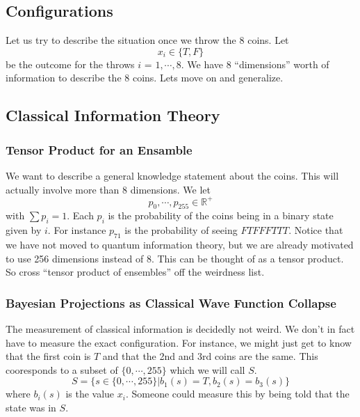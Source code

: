 \documentclass[12pt,a4paper]{article}
\begin{document}
\subsection{Configurations}
Let us try to describe the situation once we throw the 8 coins.  Let
\[
x_i \in \{T,F\}
\]
be the outcome for the throws $i$ = $1,\cdots,8$.  We have 8 ``dimensions'' worth of information to describe the 8 coins.  Lets move on and generalize.
  
\subsection{Classical Information Theory}
\subsubsection{Tensor Product for an Ensamble}
We want to describe a general knowledge statement about the coins.  This will actually involve more than 8 dimensions.  We let
\[
   p_0,\cdots,p_{255} \in \mathbb{R}^+
\]
with $\sum p_i = 1$.  Each $p_i$ is the probability of the coins being in a binary state given by $i$.  For instance $p_{71}$ is the probability of seeing $FTFFFTTT$. Notice that we have not moved to quantum information theory, but we are already motivated to use 256 dimensions instead of 8.  This can be thought of as a tensor product.  So cross ``tensor product of ensembles'' off the weirdness list.

\subsubsection{Bayesian Projections as Classical Wave Function Collapse}
The measurement of classical information is decidedly not weird.  We don't in fact have to measure the exact configuration.  For instance, we might just get to know that the first coin is $T$ and that the 2nd and 3rd coins are the same.  This cooresponds to a subset of $\{0,\cdots,255\}$ which we will call $S$.
\[
   S = \{s \in \{0,\cdots,255\} | b_1(s) = T, b_2(s) = b_3(s) \}
\]
where $b_i(s)$ is the value $x_i$.  Someone could measure this by being told that the state was in $S$.
\end{document}

